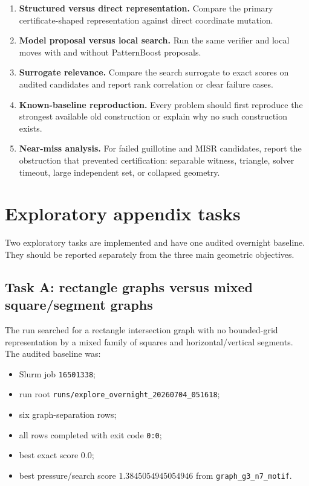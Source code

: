 \documentclass[11pt]{article}
\begin{document}
\begin{enumerate}
\item \textbf{Structured versus direct representation.}  Compare the primary
certificate-shaped representation against direct coordinate mutation.
\item \textbf{Model proposal versus local search.}  Run the same verifier and
local moves with and without PatternBoost proposals.
\item \textbf{Surrogate relevance.}  Compare the search surrogate to exact
scores on audited candidates and report rank correlation or clear failure
cases.
\item \textbf{Known-baseline reproduction.}  Every problem should first
reproduce the strongest available old construction or explain why no such
construction exists.
\item \textbf{Near-miss analysis.}  For failed guillotine and MISR candidates,
report the obstruction that prevented certification: separable witness,
triangle, solver timeout, large independent set, or collapsed geometry.
\end{enumerate}

\section{Exploratory appendix tasks}

Two exploratory tasks are implemented and have one audited overnight baseline.
They should be reported separately from the three main geometric objectives.

\subsection{Task A: rectangle graphs versus mixed square/segment graphs}

The run searched for a rectangle intersection graph with no bounded-grid
representation by a mixed family of squares and horizontal/vertical segments.
The audited baseline was:
\begin{itemize}
\item Slurm job \texttt{16501338};
\item run root \texttt{runs/explore\_overnight\_20260704\_051618};
\item six graph-separation rows;
\item all rows completed with exit code \texttt{0:0};
\item best exact score $0.0$;
\item best pressure/search score $1.3845054945054946$ from
\texttt{graph\_g3\_n7\_motif}.
\end{itemize}
\end{document}

